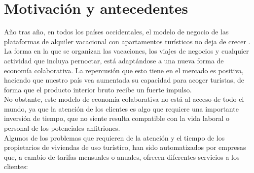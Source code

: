 \chapter{Motivación y antecedentes}
\label{ch:antecedentes}

\noindent Año tras año, en todos los países occidentales, el modelo de negocio de las plataformas de alquiler vacacional con apartamentos turísticos no deja de crecer \cite{juanjocerezo2018}. La forma en la que se organizan las vacaciones, los viajes de negocios y cualquier actividad que incluya pernoctar, está adaptándose a una nueva forma de economía colaborativa. La repercusión que esto tiene en el mercado es positiva, haciendo que nuestro país vea aumentada su capacidad para acoger turistas, de forma que el producto interior bruto recibe un fuerte impulso.\\
No obstante, este modelo de economía colaborativa no está al acceso de todo el mundo, ya que la atención de los clientes es algo que requiere una importante inversión de tiempo, que no siente resulta compatible con la vida laboral o personal de los potenciales anfitriones.\\
Algunos de los problemas que requieren de la atención y el tiempo de los propietarios de viviendas de uso turístico, han sido automatizados por empresas que, a cambio de tarifas mensuales o anuales, ofrecen diferentes servicios a los clientes:
